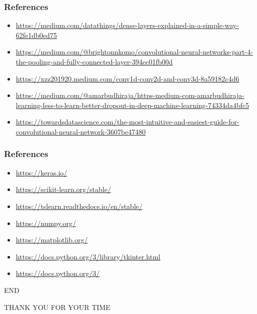 \documentclass{beamer}
\begin{document}
\begin{frame}
\frametitle{References}
\begin{itemize}
\item \textcolor{blue}{\url{https://medium.com/datathings/dense-layers-explained-in-a-simple-way-62fe1db0ed75}}
\item \textcolor{blue}{\url{https://medium.com/@brightonnkomo/convolutional-neural-networks-part-4-the-pooling-and-fully-connected-layer-394ec01fb00d}}
\item \textcolor{blue}{\url{https://xzz201920.medium.com/conv1d-conv2d-and-conv3d-8a59182c4d6}}
\item \textcolor{blue}{\url{https://medium.com/@amarbudhiraja/https-medium-com-amarbudhiraja-learning-less-to-learn-better-dropout-in-deep-machine-learning-74334da4bfc5}}
\item \textcolor{blue}{\url{https://towardsdatascience.com/the-most-intuitive-and-easiest-guide-for-convolutional-neural-network-3607be47480}}
\end{itemize}
\end{frame}

\begin{frame}
\frametitle{References}
\begin{itemize}
\item \textcolor{blue}{\url{https://keras.io/}}
\item \textcolor{blue}{\url{https://scikit-learn.org/stable/}}
\item \textcolor{blue}{\url{https://tslearn.readthedocs.io/en/stable/}}
\item \textcolor{blue}{\url{https://numpy.org/}}
\item \textcolor{blue}{\url{https://matplotlib.org/}}
\item \textcolor{blue}{\url{https://docs.python.org/3/library/tkinter.html}}
\item \textcolor{blue}{\url{https://docs.python.org/3/}}

\end{itemize}
\end{frame}

\begin{frame}{END}
\begin{center}
\Huge THANK YOU FOR YOUR TIME
\end{center}
\end{frame}
\end{document}
